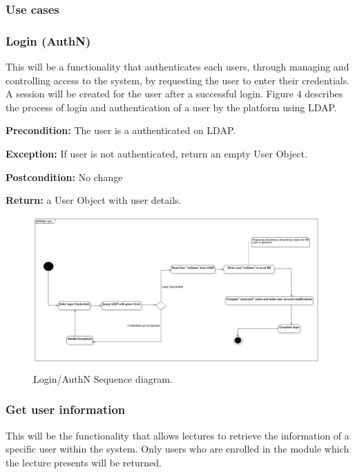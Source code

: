 \documentclass[12pt]{article}
\begin{document}
\par{}

\subsubsection{Use cases}
\subsubsection*{Login (AuthN)}
\par{This will be a functionality that authenticates each users, through managing and controlling access to the system, by requesting the user to enter their credentials. A session will be created for the user after a successful login. Figure 4 describes the process of login and authentication of a user by the platform using LDAP.}

\bigskip
\par{\textbf{Precondition:} The user is a authenticated on LDAP.}
\par{\textbf{Exception:} If user is not authenticated, return an empty User Object.}
\par{\textbf {Postcondition:} No change}
\par{\textbf {Return:} a User Object with user details. }

\begin{figure}[h!]
\includegraphics[width=\linewidth]{Diagrams/BuzzLoginAct.jpg}
\caption{Login/AuthN Sequence diagram.}
\label{Use-case: Authentication}
\end{figure}

\subsubsection*{Get user information}
\par{This will be the functionality that allows lectures to retrieve the information of a specific user within the system. Only users who are enrolled in the module which the lecture presents will be returned.}
\end{document}
